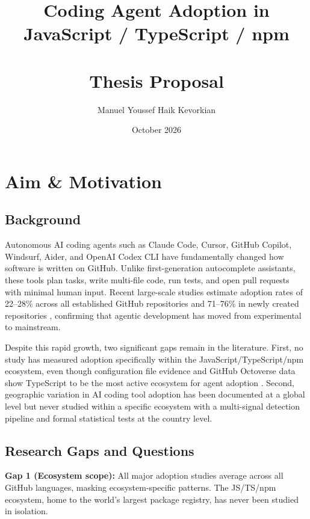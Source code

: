 \documentclass[11pt,a4paper]{article}
\title{\textbf{\Large Coding Agent Adoption in JavaScript / TypeScript / npm\\}\\[0.5em]
\Large\textbf{Thesis Proposal}}
\author{Manuel Youssef Haik Kevorkian}
\date{October 2026}
\begin{document}
\maketitle

\section{Aim \& Motivation}

\subsection{Background}

Autonomous AI coding agents such as Claude Code, Cursor, GitHub Copilot, Windsurf, Aider,
and OpenAI Codex CLI have fundamentally changed how software is written on GitHub. Unlike
first-generation autocomplete assistants, these tools plan tasks, write multi-file code, run
tests, and open pull requests with minimal human input. Recent large-scale studies estimate
adoption rates of 22--28\% across all established GitHub repositories \cite{robbes2026agenticmuch}
and 71--76\% in newly created repositories \cite{robbes2026agenticverymuch}, confirming that
agentic development has moved from experimental to mainstream.

Despite this rapid growth, two significant gaps remain in the literature. First, no study
has measured adoption specifically within the JavaScript/TypeScript/npm ecosystem, even
though configuration file evidence and GitHub Octoverse data show TypeScript to be the
most active ecosystem for agent adoption \cite{galster2026dataset, github2025octoverse}.
Second, geographic variation in AI coding tool adoption has been documented at a global
level \cite{daniotti2025} but never studied within a specific ecosystem with a multi-signal
detection pipeline and formal statistical tests at the country level.

\subsection{Research Gaps and Questions}

\textbf{Gap 1 (Ecosystem scope):} All major adoption studies average across all GitHub
languages, masking ecosystem-specific patterns. The JS/TS/npm ecosystem, home to the
world's largest package registry, has never been studied in isolation.
\end{document}
